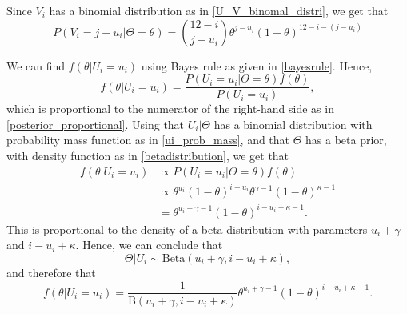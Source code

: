 Since $V_i$ has a binomial distribution as in \eqref{U_V_binomal_distri}, we get that
\begin{equation}
\label{vi_equal_j_minus_ui}
    P(V_i=j-u_i|\Theta=\theta)=\binom{12-i}{j-u_i}\theta^{j-u_i}(1-\theta)^{12-i-(j-u_i)}
\end{equation}


We can find $f(\theta| U_i=u_i)$ using Bayes rule as given in \eqref{bayesrule}. Hence,
\begin{equation*}
    f(\theta| U_i=u_i) = \frac{P(U_i=u_i|\Theta=\theta)f(\theta)}{P(U_i=u_i)},
\end{equation*}
which is proportional to the numerator of the right-hand side as in \eqref{posterior_proportional}. Using that $U_i|\Theta$ has a binomial distribution with probability mass function as in \eqref{ui_prob_mass}, and that $\Theta$ has a beta prior, with density function as in \eqref{betadistribution}, we get that
\begin{equation*}
    \begin{aligned}
        f(\theta|U_i=u_i) 
        &\propto P(U_i=u_i|\Theta=\theta)f(\theta)\\[6pt] 
        &\propto \theta^{u_i}(1-\theta)^{i-u_i}\theta^{\gamma-1}(1-\theta)^{\kappa-1}\\[6pt]
        &= \theta^{u_i+\gamma-1}(1-\theta)^{i-u_i+\kappa-1}.
    \end{aligned}
\end{equation*}
This is proportional to the density of a beta distribution with parameters $u_i+\gamma$ and $i-u_i+\kappa$. Hence, we can conclude that
\begin{equation*}
    \Theta|U_i \sim \text{Beta}(u_i+\gamma,i-u_i+\kappa),
\end{equation*}
and therefore that 
\begin{equation}
\label{theta_given_ui}
    f(\theta|U_i=u_i) = \frac{1}{\text{B}(u_i+\gamma,i-u_i+\kappa)}\theta^{u_i+\gamma-1}(1-\theta)^{i-u_i+\kappa-1}.
\end{equation}

